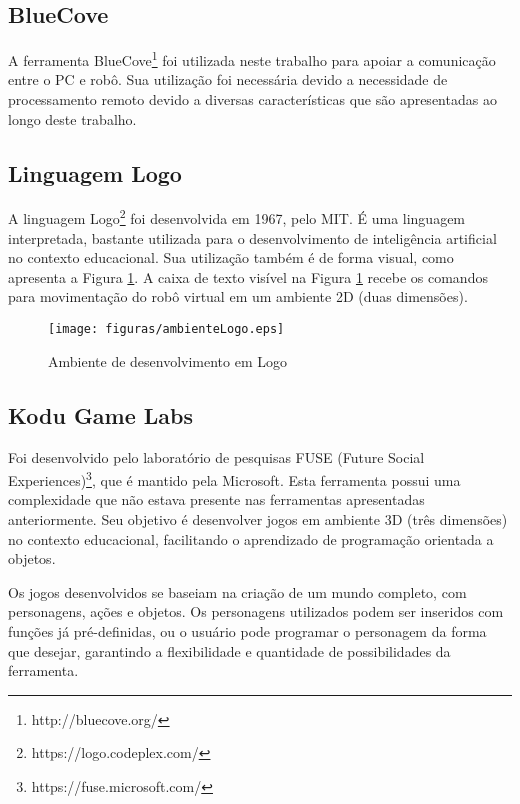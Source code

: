 
	\subsection{BlueCove} %
	\label{sub:bluecove}	
		
		A ferramenta BlueCove\footnote{http://bluecove.org/} foi utilizada neste trabalho para apoiar a comunicação entre o PC e robô. Sua utilização foi necessária devido a necessidade de processamento remoto devido a diversas características que são apresentadas ao longo deste trabalho.

	\subsection{Linguagem Logo} %
	\label{sub:linguagem_logo}

		A linguagem Logo\footnote{https://logo.codeplex.com/} foi desenvolvida em 1967, pelo MIT. É uma linguagem interpretada, bastante utilizada para o desenvolvimento de inteligência artificial no contexto educacional. Sua utilização também é de forma visual, como apresenta a Figura \ref{img:ambienteLogo}. A caixa de texto visível na Figura \ref{img:ambienteLogo} recebe os comandos para movimentação do robô virtual em um ambiente 2D (duas dimensões).

		\begin{figure}[H]
			\centering
			\texttt{[image: figuras/ambienteLogo.eps]}
			\caption[Ambiente de desenvolvimento em Logo]{Ambiente de desenvolvimento em Logo}
			\label{img:ambienteLogo}
		\end{figure}

	\subsection{Kodu Game Labs} %
	\label{sub:kodu_game_labs}

		Foi desenvolvido pelo laboratório de pesquisas FUSE (Future Social Experiences)\footnote{https://fuse.microsoft.com/}, que é mantido pela Microsoft. Esta ferramenta possui uma complexidade que não estava presente nas ferramentas apresentadas anteriormente. Seu objetivo é desenvolver jogos em ambiente 3D (três dimensões) no contexto educacional, facilitando o aprendizado de programação orientada a objetos. 

		Os jogos desenvolvidos se baseiam na criação de um mundo completo, com personagens, ações e objetos. Os personagens utilizados podem ser inseridos com funções já pré-definidas, ou o usuário pode programar o personagem da forma que desejar, garantindo a flexibilidade e quantidade de possibilidades da ferramenta.
	
